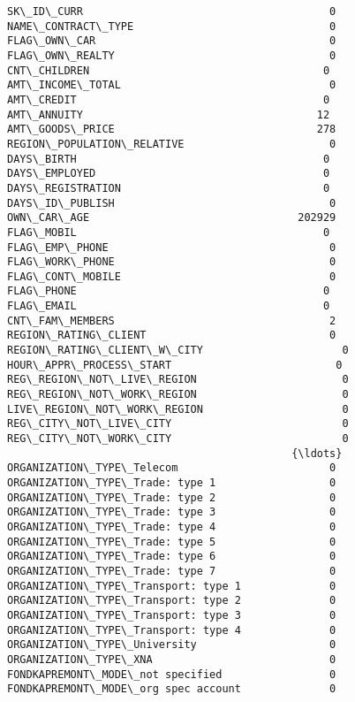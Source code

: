 \documentclass[11pt]{article}
\begin{document}
    \begin{Verbatim}[commandchars=\\\{\}]
SK\_ID\_CURR                                       0
NAME\_CONTRACT\_TYPE                               0
FLAG\_OWN\_CAR                                     0
FLAG\_OWN\_REALTY                                  0
CNT\_CHILDREN                                     0
AMT\_INCOME\_TOTAL                                 0
AMT\_CREDIT                                       0
AMT\_ANNUITY                                     12
AMT\_GOODS\_PRICE                                278
REGION\_POPULATION\_RELATIVE                       0
DAYS\_BIRTH                                       0
DAYS\_EMPLOYED                                    0
DAYS\_REGISTRATION                                0
DAYS\_ID\_PUBLISH                                  0
OWN\_CAR\_AGE                                 202929
FLAG\_MOBIL                                       0
FLAG\_EMP\_PHONE                                   0
FLAG\_WORK\_PHONE                                  0
FLAG\_CONT\_MOBILE                                 0
FLAG\_PHONE                                       0
FLAG\_EMAIL                                       0
CNT\_FAM\_MEMBERS                                  2
REGION\_RATING\_CLIENT                             0
REGION\_RATING\_CLIENT\_W\_CITY                      0
HOUR\_APPR\_PROCESS\_START                          0
REG\_REGION\_NOT\_LIVE\_REGION                       0
REG\_REGION\_NOT\_WORK\_REGION                       0
LIVE\_REGION\_NOT\_WORK\_REGION                      0
REG\_CITY\_NOT\_LIVE\_CITY                           0
REG\_CITY\_NOT\_WORK\_CITY                           0
                                             {\ldots}  
ORGANIZATION\_TYPE\_Telecom                        0
ORGANIZATION\_TYPE\_Trade: type 1                  0
ORGANIZATION\_TYPE\_Trade: type 2                  0
ORGANIZATION\_TYPE\_Trade: type 3                  0
ORGANIZATION\_TYPE\_Trade: type 4                  0
ORGANIZATION\_TYPE\_Trade: type 5                  0
ORGANIZATION\_TYPE\_Trade: type 6                  0
ORGANIZATION\_TYPE\_Trade: type 7                  0
ORGANIZATION\_TYPE\_Transport: type 1              0
ORGANIZATION\_TYPE\_Transport: type 2              0
ORGANIZATION\_TYPE\_Transport: type 3              0
ORGANIZATION\_TYPE\_Transport: type 4              0
ORGANIZATION\_TYPE\_University                     0
ORGANIZATION\_TYPE\_XNA                            0
FONDKAPREMONT\_MODE\_not specified                 0
FONDKAPREMONT\_MODE\_org spec account              0

\end{Verbatim}
\end{document}
